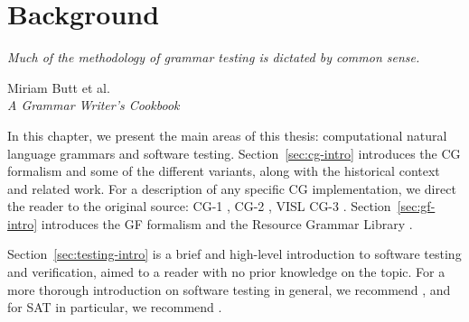 \chapter{Background}

\epigraph{\it Much of the methodology of grammar testing is dictated by common sense.}{Miriam Butt et al.\\{\it A Grammar Writer's Cookbook}}

In this chapter, we present the main areas of this thesis: computational natural language grammars and software testing.
Section~\ref{sec:cg-intro} introduces the CG formalism and some of the different variants, along with the historical context and related work.
For a description of any specific CG implementation, we direct the reader to the original source: CG-1 \cite{karlsson1990cgp,karlsson1995constraint}, CG-2 \cite{tapanainen1996}, VISL CG-3 \cite{bick2015,vislcg3}.
Section~\ref{sec:gf-intro} introduces the GF formalism \cite{ranta2011gfbook} and the Resource Grammar Library \cite{ranta2009rgl}.

Section~\ref{sec:testing-intro} is a brief and high-level introduction to software testing and verification, aimed to a reader with no prior knowledge on the topic. For a more thorough introduction on software testing in general, we recommend \cite{ammann2016introduction}, and for SAT in particular, we recommend \cite{biere2009handbook}.










